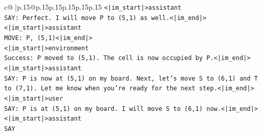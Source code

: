 \documentclass{article}
\begin{document}
{\begin{supertabular}{c@{$\;$}|p{.15\linewidth}@{}p{.15\linewidth}p{.15\linewidth}p{.15\linewidth}p{.15\linewidth}p{.15\linewidth}}
{{{\texttt{<|im\_start|>assistant} \\
\texttt{SAY: Perfect. I will move P to (5,1) as well.<|im\_end|>} \\
\texttt{<|im\_start|>assistant} \\
\texttt{MOVE: P, (5,1)<|im\_end|>} \\
\texttt{<|im\_start|>environment} \\
\texttt{Success: P moved to (5,1). The cell is now occupied by P.<|im\_end|>} \\
\texttt{<|im\_start|>assistant} \\
\texttt{SAY: P is now at (5,1) on my board. Next, let's move S to (6,1) and T to (7,1). Let me know when you're ready for the next step.<|im\_end|>} \\
\texttt{<|im\_start|>user} \\
\texttt{SAY: P is at (5,1) on my board. I will move S to (6,1) now.<|im\_end|>} \\
\texttt{<|im\_start|>assistant} \\
\texttt{SAY} \\
            }
        }
    }
     \\ \\


\end{supertabular}}
\end{document}
